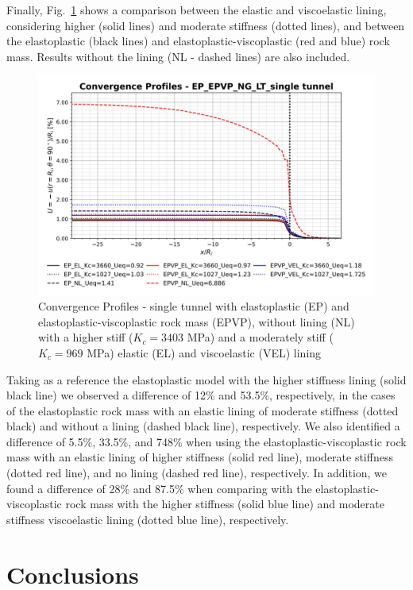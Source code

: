 \documentclass[a4paper,fleqn]{cas-sc}
\begin{document}
Finally, Fig.~\ref{EP_EPVP_NG_LT_single tunnel} shows a comparison between the elastic and viscoelastic lining, considering higher (solid lines) and moderate stiffness (dotted lines), and between the elastoplastic (black lines) and elastoplastic-viscoplastic (red and blue) rock mass. Results without the lining (NL - dashed lines) are also included.
\begin{figure}[h!]
	\centering
	\includegraphics[scale=0.7]{Convergence Profiles - EP_EPVP_NG_LT_single tunnel.pdf}
	\caption{Convergence Profiles - single tunnel with elastoplastic (EP) and elastoplastic-viscoplastic rock mass (EPVP), without lining (NL) with a higher stiff ($K_c = 3403$ MPa) and a moderately stiff ($K_c = 969$ MPa) elastic (EL) and viscoelastic (VEL) lining}
	\label{EP_EPVP_NG_LT_single tunnel}
\end{figure}
\FloatBarrier
Taking as a reference the elastoplastic model with the higher stiffness lining (solid black line) we observed a difference of 12\% and 53.5\%, respectively, in the cases of the elastoplastic rock mass with an elastic lining of moderate stiffness (dotted black) and without a lining (dashed black line), respectively. We also identified a difference of 5.5\%, 33.5\%, and 748\% when using the elastoplastic-viscoplastic rock mass with an elastic lining of higher stiffness (solid red line), moderate stiffness (dotted red line), and no lining (dashed red line), respectively. In addition, we found a difference of 28\% and 87.5\% when comparing with the elastoplastic-viscoplastic rock mass with the higher stiffness (solid blue line) and moderate stiffness viscoelastic lining (dotted blue line), respectively.

\section{Conclusions}\label{}
\end{document}
